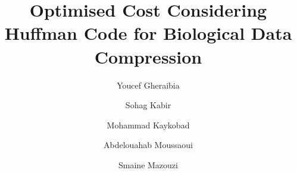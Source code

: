 \documentclass[preprint,12pt]{elsarticle}%
\begin{document}
\begin{frontmatter}



\title{Optimised Cost Considering Huffman Code for
Biological Data Compression}


\author[a,b]{Youcef Gheraibia}
\author[a]{Sohag Kabir}
\author[c]{Mohammad Kaykobad}
\author[d]{Abdelouahab Moussaoui}
\author[b]{Smaine Mazouzi}


\address[a]{Department of Computer Science, University of Hull, Hull HU6 7RX, UK}

\address[b]{Department of Computer Science, Badji Mokhtar-Annaba University, P.O. Box 12, 23000 Annaba, Algeria}


\address[c]{Department of Computer Science and Engineering, Bangladesh University of Engineering and Technology, Dhaka 1000, Bangladesh}

\address[d]{LRIA laboratory, Department of Computer Science, University of Setif, 19000, Algeria}








\end{frontmatter}
\end{document}
